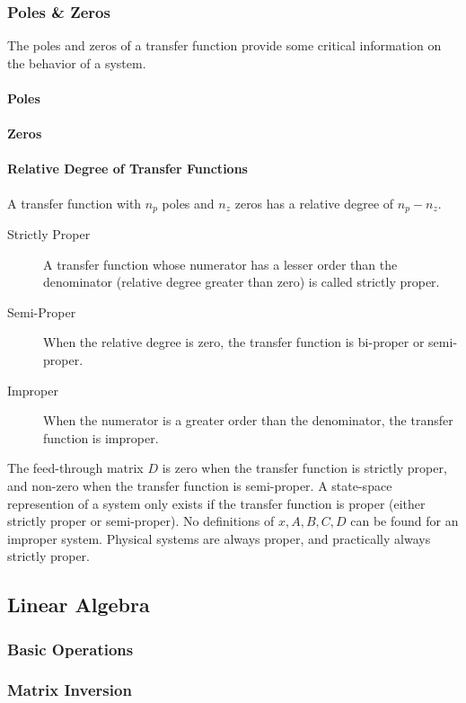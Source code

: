 \documentclass[../notes.tex]{subfiles}
\begin{document}
\subsubsection{Poles \& Zeros}
The poles and zeros of a transfer function provide some critical information on the behavior of a system.

\paragraph{Poles}

\paragraph{Zeros}

\paragraph{Relative Degree of Transfer Functions}
A transfer function with $n_p$ poles and $n_z$ zeros has a relative degree of $n_p - n_z$. \\
\begin{description}
    \item[Strictly Proper] A transfer function whose numerator has a lesser order than the denominator (relative degree greater than zero) is called strictly proper.
    \item[Semi-Proper] When the relative degree is zero, the transfer function is bi-proper or semi-proper.
    \item[Improper] When the numerator is a greater order than the denominator, the transfer function is improper. 
\end{description}
The feed-through matrix $D$ is zero when the transfer function is strictly proper, and non-zero when the transfer function is semi-proper. A state-space represention of a system only exists if the transfer function is proper (either strictly proper or semi-proper). No definitions of $x, A, B, C, D$ can be found for an improper system. Physical systems are always proper, and practically always strictly proper.

\subsection{Linear Algebra}
\subsubsection{Basic Operations}
\subsubsection{Matrix Inversion}
\end{document}

